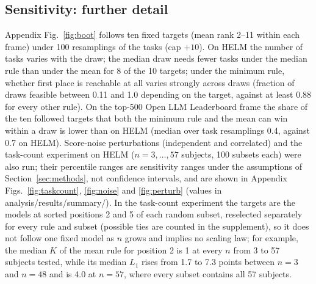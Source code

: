 \subsection*{Sensitivity: further detail}
\label{app:sens}
Appendix Fig.~\ref{fig:boot} follows ten fixed targets (mean rank 2--11 within each frame) under 100 resamplings of the tasks (cap $+10$). On HELM the number of tasks varies with the draw; the median draw needs fewer tasks under the median rule than under the mean for 8 of the 10 targets; under the minimum rule, whether first place is reachable at all varies strongly across draws (fraction of draws feasible between 0.11 and 1.0 depending on the target, against at least 0.88 for every other rule). On the top-500 Open LLM Leaderboard frame the share of the ten followed targets that both the minimum rule and the mean can win within a draw is lower than on HELM (median over task resamplings 0.4, against 0.7 on HELM). Score-noise perturbations (independent and correlated) and the task-count experiment on HELM ($n=3,\dots,57$ subjects, 100 subsets each) were also run; their percentile ranges are sensitivity ranges under the assumptions of Section~\ref{sec:methods}, not confidence intervals, and are shown in Appendix Figs.~\ref{fig:taskcount}, \ref{fig:noise} and \ref{fig:perturb} (values in analysis/results/summary/). In the task-count experiment the targets are the models at sorted positions 2 and 5 of each random subset, reselected separately for every rule and subset (possible ties are counted in the supplement), so it does not follow one fixed model as $n$ grows and implies no scaling law; for example, the median $K$ of the mean rule for position 2 is 1 at every $n$ from 3 to 57 subjects tested, while its median $L_1$ rises from 1.7 to 7.3 points between $n=3$ and $n=48$ and is 4.0 at $n=57$, where every subset contains all 57 subjects.

